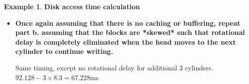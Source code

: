\documentclass[11pt,a4paper]{article}
\theoremstyle{definition}
\newtheorem{example}{Example}[section]
\newenvironment{myitemize}
{ \begin{itemize}
    \setlength{\itemsep}{5pt}
    \setlength{\parskip}{0pt}
    \setlength{\parsep}{0pt}     }
{ \end{itemize}                  }
\begin{document}
\begin{example}{\textbf{Disk access time calculation}}
\begin{myitemize}
\begin{myitemize}
			Rotation delay still 8.3ms; Total time to read data still: 0.08192ms
			
			Total: $3\times (2+8.3+0.08192)\times 3 = 31.146$ms
		\end{myitemize}
		
		\textbf{Total time taken}: 40.6+20.382+31.146=92.128ms
		
		\item \textbf{Once again assuming that there is no caching or buffering, repeat part b. assuming that the blocks are *skewed* such that rotational delay is completely eliminated when the head moves to the next cylinder to continue writing.}
		
		Same timing, except no rotational delay for additional 3 cylinders. $92.128 - 3\times8.3 = 67.228 $ms
	\end{myitemize}
\end{example}



\end{document}
